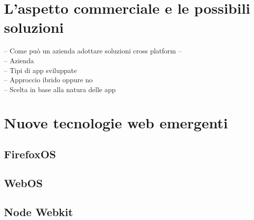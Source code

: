 \section{L'aspetto commerciale e le possibili soluzioni}

-- Come può un azienda adottare soluzioni cross platform --\\
-- Azienda\\
	-- Tipi di app sviluppate\\
	-- Approccio ibrido oppure no\\
	-- Scelta in base alla natura delle app

\section{Nuove tecnologie web emergenti}

\subsection{FirefoxOS}

\subsection{WebOS}

\subsection{Node Webkit}